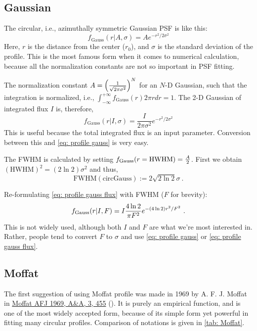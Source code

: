 \subsection{Gaussian}
The circular, i.e., azimuthally symmetric Gaussian PSF is like this:
\begin{equation}\label{eq: profile gauss}
  f_\mathrm{Gauss}(r|A, \sigma) = A e^{ -r^2 / 2\sigma^2 } 
\end{equation}
Here, $r$ is the distance from the center ($r_0$), and $\sigma$ is the standard deviation of the profile. This is the most famous form when it comes to numerical calculation, because all the normalization constants are not so important in PSF fitting.

The normalization constant $A = \qty( \frac{1}{\sqrt{2 \pi \sigma^2}} )^N$ for an $ N $-D Gaussian, such that the integration is normalized, i.e., $ \int_{-\infty}^{+\infty} f_\mathrm{Gauss}(r) 2\pi r dr = 1$. The 2-D Gaussian of integrated flux $ I $ is, therefore,
\begin{equation}\label{eq: profile gauss flux}
  f_\mathrm{Gauss}(r|I, \sigma) = \frac{I}{2 \pi \sigma^2} e^{ -r^2 / 2\sigma^2 }
\end{equation}
This is useful because the total integrated flux is an input parameter. Conversion between this and \cref{eq: profile gauss} is very easy.

The FWHM is calculated by setting $f_{\rm Gauss}(r = \mathrm{HWHM}) = \frac{A}{2}$. First we obtain $ (\mathrm{HWHM})^2 = (2 \ln 2) \sigma^2 $ and thus,
\begin{equation}\label{eq: FWHM gauss}
  \mathrm{FWHM (circ Gauss)} := 2 \sqrt{2 \ln 2} \sigma ~.
\end{equation}

Re-formulating \cref{eq: profile gauss flux} with FWHM ($ F $ for brevity):
\begin{equation}\label{eq: profile gauss fwhm}
  f_{\rm Gauss}(r|I, F) = I \frac{4\ln 2}{\pi F^2} e^{ - (4 \ln 2) r^2 / F^2 } ~.
\end{equation}
This is not widely used, although both $ I $ and $ F $ are what we're most interested in. Rather, people tend to convert $ F $ to $ \sigma $ and use \cref{eq: profile gauss} or \cref{eq: profile gauss flux}.

\subsection{Moffat}
The first suggestion of using Moffat profile was made in 1969 by A. F. J. Moffat in \href{https://ui.adsabs.harvard.edu/abs/1969A\%26A.....3..455M}{Moffat AFJ 1969, A\&A, 3, 455} (). It is purely an empirical function, and is one of the most widely accepted form, because of its simple form yet powerful in fitting many circular profiles. Comparison of notations is given in \cref{tab: Moffat}.

